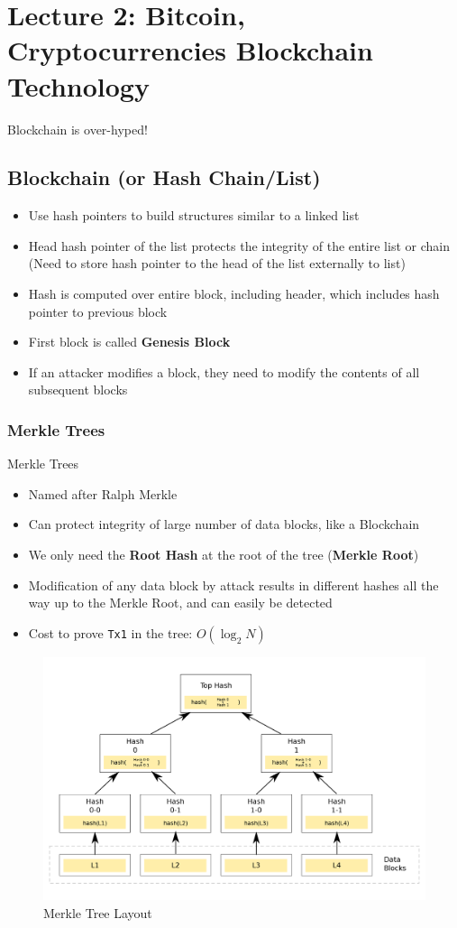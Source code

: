 \section{Lecture 2: Bitcoin, Cryptocurrencies Blockchain Technology}
Blockchain is over-hyped!
\subsection{Blockchain (or Hash Chain/List)}
\begin{itemize}
	\item Use hash pointers to build structures similar to a linked list
	\item Head hash pointer of the list protects the integrity of the entire list or chain (Need to store hash pointer to the head of the list externally to list)
	\item Hash is computed over entire block, including header, which includes hash pointer to previous block
	\item First block is called \textbf{Genesis Block}
	\item If an attacker modifies a block, they need to modify the contents of all subsequent blocks
\end{itemize}
\subsubsection{Merkle Trees}
\begin{note}{Merkle Trees}
	\begin{itemize}
		\item Named after Ralph Merkle
		\item Can protect integrity of large number of data blocks, like a Blockchain
		\item We only need the \textbf{Root Hash} at the root of the tree (\textbf{Merkle Root})
		\item Modification of any data block by attack results in different hashes all the way up to the Merkle Root, and can easily be detected
		\item Cost to prove \texttt{Tx1} in the tree: $O(\log_2 N)$
	\end{itemize}
\end{note}
\begin{figure}[H]
	\includegraphics[width=\linewidth]{merkle}
	\centering
	\caption{Merkle Tree Layout}
\end{figure}
